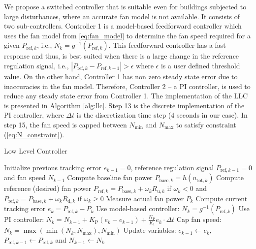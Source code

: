 We propose a switched controller that is suitable even for buildings subjected to large disturbances, where an accurate fan model is not available. 
It consists of two sub-controllers. 
Controller 1 is a model-based feedforward controller which uses the fan model from \eqref{eq:fan_model} to determine the fan speed required for a given $P_{\text{ref},k}$, i.e., $N_k = g^{-1}(P_{\text{ref},k})$. 
This feedforward controller has a fast response and thus, is best suited when there is a large change in the reference regulation signal, i.e., $|P_{\text{ref},k} - P_{\text{ref},k-1}|>\epsilon$ where $\epsilon$ is a user defined threshold value. 
On the other hand, Controller 1 has non zero steady state error due to inaccuracies in the fan model. 
Therefore, Controller 2 -- a PI controller, is used to reduce any steady state error from Controller 1. 
The implementation of the LLC is presented in Algorithm \ref{alg:llc}.
Step 13 is the discrete implementation of the PI controller, where $\Delta t$ is the discretization time step (4 seconds in our case).
In step 15, the fan speed is capped between $N_\text{min}$ and $N_\text{max}$ to satisfy constraint (\ref{eq:N_constraint}).

\begin{algorithm}
\caption{Low Level Controller}
\label{alg:llc}
\begin{algorithmic}[1]
\State Initialize previous tracking error $e_{k-1} = 0$, reference regulation signal $P_{\text{ref},k-1}=0$ and fan speed $N_{k-1}$ 
	\State Compute baseline fan power $P_{\text{base},k} = h(u_{\text{tot},k})$
	\State Compute reference (desired) fan power $P_{\text{ref},k} = P_{\text{base},k}+\omega_k R_{\text{u},k}$ if $\omega_k<0$ and $P_{\text{ref},k} = P_{\text{base},k}+\omega_k R_{\text{d},k}$ if $\omega_k \geq0$
	\State Measure actual fan power $P_k$
	\State Compute current tracking error $e_k = P_{\text{ref},k} - P_k$ 
		\State Use model-based controller:
    		\State $N_k = g^{-1}(P_{\text{ref},k})$
    	\Else
		\State Use PI controller:
        	\State $N_k = N_{k-1} + K_\text{P} (e_k-e_{k-1})+\frac{K_\text{P}}{K_\text{I}} e_k \cdot \Delta t$	
    	\EndIf
	\State Cap fan speed: $N_k = \max(\min(N_k,N_\text{max}),N_\text{min})$
	\State Update variables: $e_{k-1} \gets e_k$, $P_{\text{ref},k-1} \gets P_{\text{ref},k}$ and $N_{k-1} \gets N_k$
\EndWhile
\end{algorithmic}
\end{algorithm}

